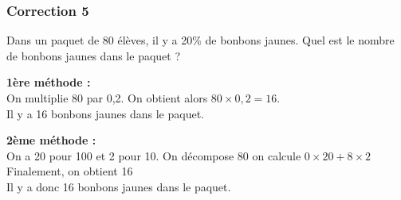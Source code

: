 \documentclass[15pt, mathserif]{beamer}
\begin{document}
\begin{frame}
\vspace{-10mm}
	\frametitle{Correction 5}
Dans un paquet de 80 élèves, il y a 20\% de bonbons jaunes. Quel est le nombre de bonbons jaunes dans le paquet ? \begin{multicols}{2} \textbf{1ère méthode : \\} On multiplie 80 par 0,2. On obtient alors $80 \times 0,2=16$. \\ Il y a 16 bonbons jaunes dans le paquet. 
 \columnbreak 
 
 \textbf{2ème méthode :} \\ On a 20 pour 100 et 2 pour 10. On décompose 80 on calcule $0\times20+8\times2$ \\ Finalement, on obtient 16\\ Il y a donc 16 bonbons jaunes dans le paquet. \end{multicols}\end{frame}
\end{document}
